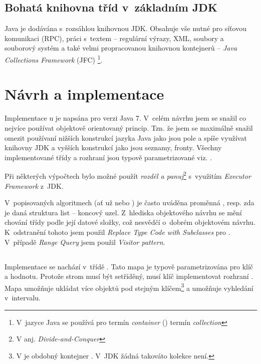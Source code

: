 \subsection{Bohatá knihovna tříd v~základním JDK}

Java je dodávána s~rozsáhlou knihovnou JDK. Obsahuje vše nutné
pro síťovou komunikaci (RPC), práci s~textem -- regulární výrazy,
XML, soubory a souborový
systém a také velmi propracovanou knihovnou kontejnerů -- \emph{Java
Collections Framework }(JFC)
\footnote{V~jazyce Java se používá pro termín \emph{container} (\CC) termín
\emph{collection}}.

\section{Návrh a implementace}
Implementace \MIndex u je napsána pro verzi Java 7.
V~celém návrhu jsem se snažil co nejvíce používat objektově orientovaný princip.
Tzn. že jsem se maximálně snažil omezit používaní nižších konstrukcí jazyka Java jako jsou pole a spíše využívat knihovny JDK a vyšších konstrukcí jako jsou seznamy, fronty.
Všechny implementované třídy a rozhraní jsou typově parametrizované viz. .

Při některých výpočtech bylo možné použít \emph{rozděl a panuj}\cite{Cormen:2001:IA:580470}\footnote{V anj. \emph{Divide-and-Conquer}} s~využitím \emph{Executor Framework} z~JDK.

V~popisovaných algoritmech (ať už \BPTree{} nebo \MIndex) je často uváděna proměnná , resp. zda je daná struktura list -- koncový uzel.
Z~hlediska objektového návrhu se mění chování třídy podle její datové složky, což nesvědčí o~dobrém objektovém návrhu.
K~odstranění tohoto jsem použil \emph{Replace Type Code with Subclasses}\cite{fowler1999refactoring} pro \BPTree.
V~případě \MIndex{} \emph{Range Query} jsem použil \emph{Visitor pattern}\cite{gamma1995design}.

\subsection{\BPTree}
Implementace \BPTree{} se nachází v~třídě \linebreak {}. Tato mapa je typově parametrizována pro klíč a hodnotu. Protože strom musí být setříděný, musí klíč implementovat rozhraní . Mapa umožňuje ukládat více objektů pod stejným klíčem\footnote{V \CC{} je obdobný kontejner \cite{ISO:2012:CPP}. V~JDK žádná takováto kolekce není.} a umožňuje vyhledání v~intervalu.

